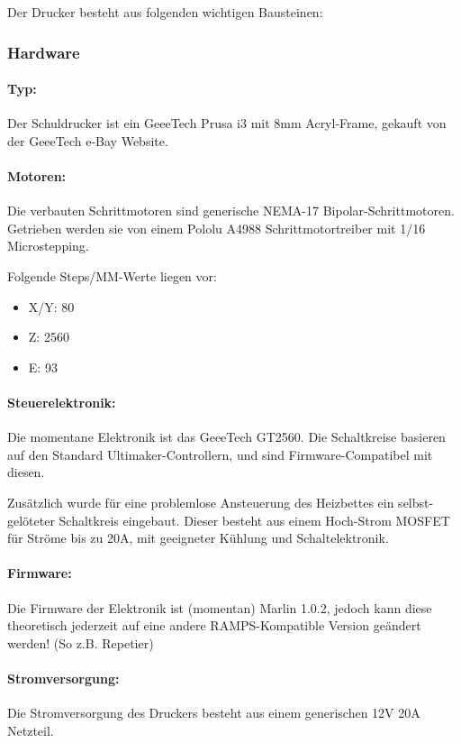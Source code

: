 Der Drucker besteht aus folgenden wichtigen Bausteinen: 

\subsubsection{Hardware}

\paragraph{Typ:}
Der Schuldrucker ist ein GeeeTech Prusa i3 mit 8mm Acryl-Frame, gekauft von der GeeeTech e-Bay Website.

\paragraph{Motoren:} 
Die verbauten Schrittmotoren sind generische NEMA-17 Bipolar-Schrittmotoren. Getrieben werden sie von einem Pololu A4988 Schrittmotortreiber mit 1/16 Microstepping.

Folgende Steps/MM-Werte liegen vor:
\begin{itemize}[noitemsep]
\item X/Y: 80
\item Z:   2560
\item E:   93
\end{itemize}

\paragraph{Steuerelektronik:}
Die momentane Elektronik ist das GeeeTech GT2560. Die Schaltkreise basieren auf den Standard Ultimaker-Controllern, und sind Firmware-Compatibel mit diesen.

Zusätzlich wurde für eine problemlose Ansteuerung des Heizbettes ein selbst-gelöteter Schaltkreis eingebaut.
Dieser besteht aus einem Hoch-Strom MOSFET für Ströme bis zu 20A, mit geeigneter Kühlung und Schaltelektronik.

\paragraph{Firmware:}
Die Firmware der Elektronik ist (momentan) Marlin 1.0.2, jedoch kann diese theoretisch jederzeit auf eine andere RAMPS-Kompatible Version geändert werden! (So z.B. Repetier)

\paragraph{Stromversorgung:}
Die Stromversorgung des Druckers besteht aus einem generischen 12V 20A Netzteil.

